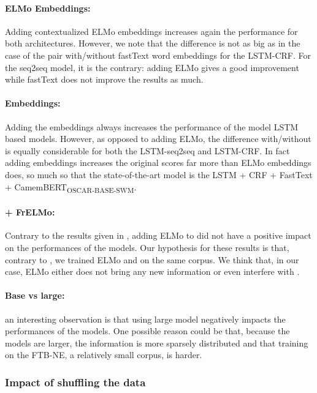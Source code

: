 \paragraph{ELMo Embeddings:} Adding contextualized ELMo embeddings increases again the performance for both architectures. However, we note that the difference is not as big as in the case of the pair with/without fastText word embeddings for the LSTM-CRF. For the seq2seq model, it is the contrary: adding ELMo gives a good improvement while fastText does not improve the results as much.

\paragraph{\camembert Embeddings:} Adding the \camembert embeddings always increases the performance of the model LSTM based models. However, as opposed to adding ELMo, the difference with/without \camembert is equally considerable for both the LSTM-seq2seq and LSTM-CRF. In fact adding \camembert embeddings increases the original scores far more than ELMo embeddings does, so much so that the state-of-the-art model is the LSTM + CRF + FastText + CamemBERT\textsubscript{OSCAR-BASE-SWM}.

\paragraph{\camembert + FrELMo:} Contrary to the results given in \citet{strakova-etal-2019-neural}, adding ELMo to \camembert did not have a positive impact on the performances of the models. Our hypothesis for these results is that, contrary to \citet{strakova-etal-2019-neural}, we trained ELMo and \camembert on the same corpus. We think that, in our case, ELMo either does not bring any new information or even interfere with \camembert.

\paragraph{Base vs large:} an interesting observation is that using large model negatively impacts the performances of the models. One possible reason could be that, because the models are larger, the information is more sparsely distributed and that training on the FTB-NE, a relatively small corpus, is harder.

\subsubsection{Impact of shuffling the data}
\label{subsubsec:shuffling}

